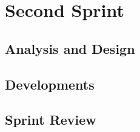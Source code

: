 \chapter{Second Sprint}


\section{Analysis and Design}

\section{Developments}

\section{Sprint Review}
